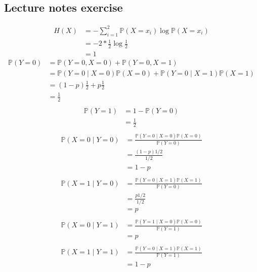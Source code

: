 \documentclass{article}
\newcommand{\1}{\mathbf{1}}
\renewcommand{\P}{\mathbb{P}}
\begin{document}
\subsection{Lecture notes exercise}
\begin{align*}
  H(X)
   & = - \sum_{i=1}^2 \P(X = x_i) \log \P(X = x_i) \\
   & = - 2 * \frac{1}{2} \log \frac{1}{2}          \\
   & = 1
\end{align*}
\begin{align*}
  \P(Y = 0)
   & = \P(Y = 0, X = 0) + \P(Y = 0, X = 1)                             \\
   & = \P(Y = 0 \mid X = 0) \P(X = 0) + \P(Y = 0 \mid X = 1) \P(X = 1) \\
   & = (1-p) \frac{1}{2} + p \frac{1}{2}                               \\
   & = \frac{1}{2}                                                     \\
\end{align*}
\begin{align*}
  \P(Y = 1)
   & = 1 - \P(Y = 0) \\
   & = \frac{1}{2}   \\
\end{align*}
\begin{align*}
  \P(X = 0 \mid Y = 0)
   & = \frac{\P(Y = 0 \mid X = 0) \P(X = 0)}{\P(Y = 0)} \\
   & = \frac{(1 - p) 1/2}{1/2}                          \\
   & = 1 - p                                            \\
\end{align*}
\begin{align*}
  \P(X = 1 \mid Y = 0)
   & = \frac{\P(Y = 0 \mid X = 1) \P(X = 1)}{\P(Y = 0)} \\
   & = \frac{p 1/2}{1/2}                                \\
   & = p                                                \\
\end{align*}
\begin{align*}
  \P(X = 0 \mid Y = 1)
   & = \frac{\P(Y = 1 \mid X = 0) \P(X = 0)}{\P(Y = 1)} \\
   & = p                                                \\
\end{align*}
\begin{align*}
  \P(X = 1 \mid Y = 1)
   & = \frac{\P(Y = 0 \mid X = 1) \P(X = 1)}{\P(Y = 1)} \\
   & = 1 - p                                            \\
\end{align*}
\end{document}
